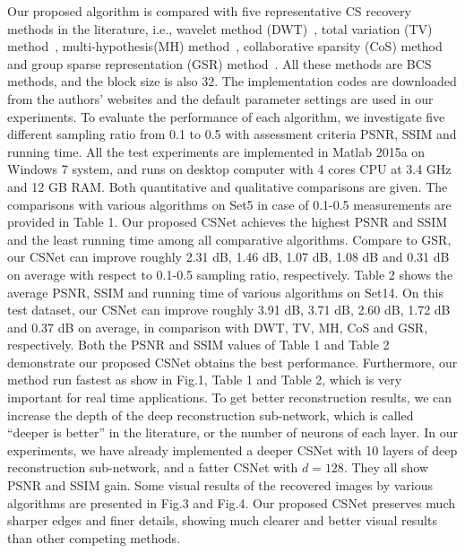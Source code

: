 \documentclass[5pt]{article}
\begin{document}
Our proposed algorithm is compared with five representative CS recovery methods in the literature, i.e., wavelet method (DWT)~\cite{rf27}, total variation (TV) method~\cite{rf7}, multi-hypothesis(MH) method~\cite{rf10}, collaborative sparsity (CoS) method~\cite{rf28} and group sparse representation (GSR) method~\cite{rf11}. All these methods are BCS methods, and the block size is also 32. The implementation codes are downloaded from the authors’ websites and the default parameter settings are used in our experiments. To evaluate the performance of each algorithm, we investigate five different sampling ratio from 0.1 to 0.5 with assessment criteria PSNR, SSIM and running time. All the test experiments are implemented in Matlab 2015a on Windows 7 system, and runs on desktop computer with 4 cores CPU at 3.4 GHz and 12 GB RAM. Both quantitative and qualitative comparisons are given. The comparisons with various algorithms on Set5 in case of 0.1-0.5 measurements are provided in Table 1. Our proposed CSNet achieves the highest PSNR and SSIM and the least running time among all comparative algorithms. Compare to GSR, our CSNet can improve roughly 2.31 dB, 1.46 dB, 1.07 dB, 1.08 dB and 0.31 dB on average with respect to 0.1-0.5 sampling ratio, respectively. Table 2 shows the average PSNR, SSIM and running time of various algorithms on Set14. On this test dataset, our CSNet can improve roughly 3.91 dB, 3.71 dB, 2.60 dB, 1.72 dB and 0.37 dB on average, in comparison with DWT, TV, MH, CoS and GSR, respectively. Both the PSNR and SSIM values of Table 1 and Table 2 demonstrate our proposed CSNet obtains the best performance. Furthermore, our method run fastest as show in Fig.1, Table 1 and Table 2, which is very important for real time applications. To get better reconstruction results, we can increase the depth of the deep reconstruction sub-network, which is called “deeper is better” in the literature, or the number of neurons of each layer. In our experiments, we have already implemented a deeper CSNet with 10 layers of deep reconstruction sub-network, and a fatter CSNet with $d = 128$. They all show PSNR and SSIM gain. Some visual results of the recovered images by various algorithms are presented in Fig.3 and Fig.4. Our proposed CSNet preserves much sharper edges and finer details, showing much clearer and better visual results than other competing methods.
\end{document}
